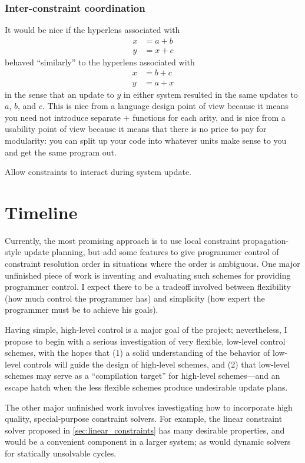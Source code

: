 \subsubsection{Inter-constraint coordination}
It would be nice if the hyperlens associated with
\begin{align*}
    x &= a+b \\
    y &= x+c
\end{align*}
behaved ``similarly'' to the hyperlens associated with
\begin{align*}
    x &= b+c \\
    y &= a+x
\end{align*}
in the sense that an update to $y$ in either system resulted in the same
updates to $a$, $b$, and $c$. This is nice from a language design point of
view because it means you need not introduce separate $+$ functions for each
arity, and is nice from a usability point of view because it means that
there is no price to pay for modularity: you can split up your code into
whatever units make sense to you and get the same program out.

\begin{desiderata}
    Allow constraints to interact during system update.
\end{desiderata}
\section{Timeline}
\label{sec:timeline}
Currently, the most promising approach is to use local constraint
propagation-style update planning, but add some features to give programmer
control of constraint resolution order in situations where the order is
ambiguous. One major unfinished piece of work is inventing and evaluating
such schemes for providing programmer control. I expect there to be a
tradeoff involved between flexibility (how much control the programmer has)
and simplicity (how expert the programmer must be to achieve his goals).

Having simple, high-level control is a major goal of the project;
nevertheless, I propose to begin with a serious investigation of very
flexible, low-level control schemes, with the hopes that (1) a solid
understanding of the behavior of low-level controls will guide the design of
high-level schemes, and (2) that low-level schemes may serve as a
``compilation target'' for high-level schemes---and an escape hatch when the
less flexible schemes produce undesirable update plans.

The other major unfinished work involves investigating how to incorporate
high quality, special-purpose constraint solvers. For example, the linear
constraint solver proposed in \ref{sec:linear_constraints} has many
desirable properties, and would be a convenient component in a larger
system; as would dynamic solvers for statically unsolvable cycles.

